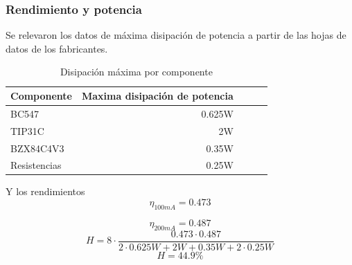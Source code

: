 \subsubsection{Rendimiento y potencia}
Se relevaron los datos de máxima disipación de potencia a partir de las hojas de datos de los fabricantes.


\begin{table}[H]
	\centering
	\begin{tabular}{@{}lrlll@{}}
		\toprule
		\multicolumn{1}{c}{\textbf{Componente}} & \multicolumn{1}{c}{\textbf{Maxima disipación de potencia}} &  &  &  \\ \midrule
		BC547        & 0.625W &  &  &  \\
		TIP31C       & 2W     &  &  &  \\
		BZX84C4V3    & 0.35W  &  &  &  \\ 
		Resistencias & 0.25W  &  &  &  \\ \bottomrule
	\end{tabular}
	\caption{Disipación máxima por componente}
	\label{tab:acqCap}
\end{table}


Y los rendimientos
$$\eta_{100mA} = 0.473$$

$$\eta_{200mA} = 0.487$$
\begin{equation}
H = 8 \cdot \frac{0.473 \cdot 0.487}{2\cdot 0.625W+2W+0.35W+2\cdot0.25W}
\end{equation}
\begin{equation}
	H = 44.9\%
\end{equation}